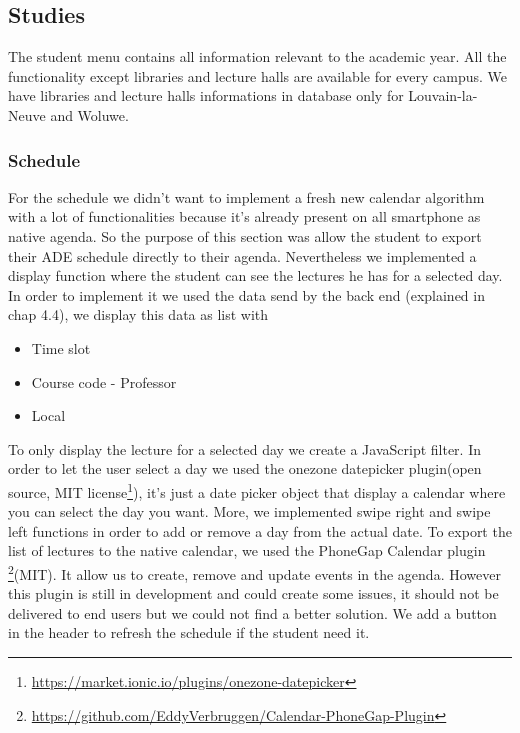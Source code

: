 \documentclass{eplmastersthesis}
\begin{document}
\subsection{Studies}
The student menu contains all information relevant to the academic year. All the functionality except libraries and lecture halls are available for every campus. We have libraries and lecture halls informations in database only for Louvain-la-Neuve and Woluwe. 
\subsubsection{Schedule}
For the schedule we didn't want to implement a fresh new calendar algorithm with a lot of functionalities because it's already present on all smartphone as native agenda. So the purpose of this section was allow the student to export their ADE schedule directly to their agenda. Nevertheless we implemented a display function where the student can see the lectures he has for a selected day. In order to implement it we used the data send by the back end (explained in chap 4.4), we display this data as list with
\begin{itemize}
\item Time slot
\item Course code - Professor
\item Local
\end{itemize}
To only display the lecture for a selected day we create a JavaScript filter. In order to let the user select a day we used the onezone datepicker plugin(open source, MIT license\footnote{\url{https://market.ionic.io/plugins/onezone-datepicker}}), it's just a date picker object that display a calendar where you can select the day you want. More, we implemented swipe right and swipe left functions in order to add or remove a day from the actual date.
To export the list of lectures to the native calendar, we used the PhoneGap Calendar plugin \footnote{\url{https://github.com/EddyVerbruggen/Calendar-PhoneGap-Plugin}}(MIT). It allow us to create, remove and update events in the agenda. However this plugin is still in development and could create some issues, it should not be delivered to end users but we could not find a better solution. We add a button in the header to refresh the schedule if the student need it. 
\end{document}

